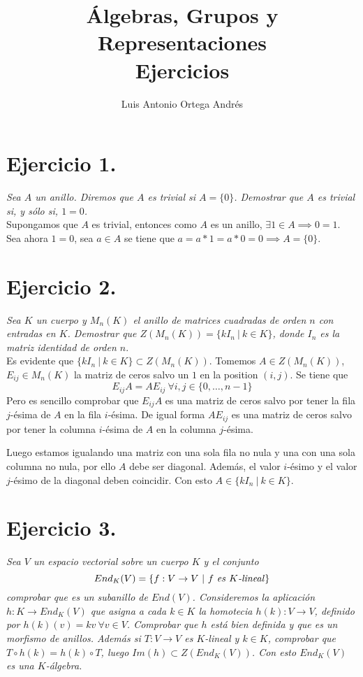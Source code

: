 \documentclass[UTF8]{article}
\begin{document}
\title{Álgebras, Grupos y Representaciones \\
      \large Ejercicios
  }

\author{Luis Antonio Ortega Andrés}

\maketitle

\section{Ejercicio 1.} \emph{Sea \(A\) un anillo. Diremos que \(A\) es trivial si
  \(A = \{0\}\). Demostrar que \(A\) es trivial si, y sólo si, \(1 = 0\).}\\

Supongamos que \(A\) es trivial, entonces como \(A\) es un anillo, \(\exists 1
\in A \implies 0 = 1\). Sea ahora \(1 = 0\), sea \(a \in A\) se tiene que \(a =
a*1 = a*0 = 0 \implies A = \{0\}\).

\section{Ejercicio 2.} \emph{Sea \(K\) un cuerpo y \(M_n(K)\) el anillo de
  matrices cuadradas de orden \(n\) con entradas en \(K\). Demostrar que
  \(Z(M_n(K)) = \{kI_n \ | \  k \in K\}\), donde \(I_n\) es la matriz identidad
  de orden \(n\)}.\\

Es evidente que  \(\{kI_n \ | \  k \in K\} \subset Z(M_n(K))\). Tomemos \(A \in
Z(M_n(K))\), \(E_{ij} \in M_n(K)\) la matriz de ceros salvo un \(1\) en la
position \((i,j)\). Se tiene que
\[
E_{ij}A = AE_{ij} \ \forall i,j \in \{0,\dots,n-1\}
\]
Pero es sencillo comprobar que \(E_{ij}A\) es una matriz de ceros salvo por
tener la fila \(j\)-ésima de \(A\) en la fila \(i\)-ésima. De igual forma \(AE_{ij}\) es una matriz de ceros salvo por
tener la columna \(i\)-ésima de \(A\) en la columna \(j\)-ésima.

Luego estamos igualando una matriz con una sola fila no nula y una con una sola
columna no nula, por ello \(A\) debe ser diagonal. Además, el valor \(i\)-ésimo
y el valor \(j\)-ésimo de la diagonal deben coincidir. Con esto \(A \in \{kI_n
\ | \  k \in K\}\).

\section{Ejercicio 3.} \emph{Sea \(V\) un espacio vectorial sobre un cuerpo \(K\)
  y el
  conjunto}
\[
End_K(V) = \{f:V \to V \ | \ f \text{ \emph{es} } K\text{\emph{-lineal}}\}
\]
\emph{comprobar que es un subanillo de \(End(V)\). Consideremos la aplicación \(h:K \to End_K(V)\)
que asigna a cada \(k \in K\) la homotecia \(h(k):V \to V\), definido por
\(h(k)(v) = kv \ \forall v \in V\). Comprobar que \(h\) está bien definida y que es
un morfismo de anillos. Además si \(T:V \to V\) es \(K\)-lineal y \(k \in K\),
comprobar que \(T \circ h(k) = h(k) \circ T\), luego \(Im(h) \subset
Z(End_K(V))\). Con esto \(End_K(V)\) es una \(K\)-álgebra.}\\
\end{document}

